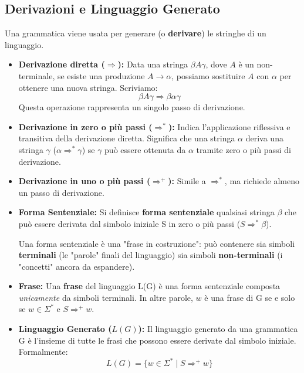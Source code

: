 \subsection{Derivazioni e Linguaggio Generato}
Una grammatica viene usata per generare (o \textbf{derivare}) le stringhe di un linguaggio.
\begin{itemize}
    \item \textbf{Derivazione diretta ($\Rightarrow$):} Data una stringa $\beta A \gamma$, dove $A$ è un non-terminale, se esiste una produzione $A \rightarrow \alpha$, possiamo sostituire $A$ con $\alpha$ per ottenere una nuova stringa. Scriviamo:
    \[ \beta A \gamma \Rightarrow \beta \alpha \gamma \]
   Questa operazione rappresenta un singolo passo di derivazione. 
    
    \item \textbf{Derivazione in zero o più passi ($\Rightarrow^*$):} Indica l'applicazione riflessiva e transitiva della derivazione diretta. Significa che una stringa $\alpha$ deriva una stringa $\gamma$ ($\alpha \Rightarrow^* \gamma$) se $\gamma$ può essere ottenuta da $\alpha$ tramite zero o più passi di derivazione. 
    
    \item \textbf{Derivazione in uno o più passi ($\Rightarrow^+$):} Simile a $\Rightarrow^*$, ma richiede almeno un passo di derivazione. 
    
    \item \textbf{Forma Sentenziale:} Si definisce \textbf{forma sentenziale} qualsiasi stringa $\beta$ che può essere derivata dal simbolo iniziale S in zero o più passi ($S \Rightarrow^* \beta$). 
    
    Una forma sentenziale è una "frase in costruzione": può contenere sia simboli \textbf{terminali} (le "parole" finali del linguaggio) sia simboli \textbf{non-terminali} (i "concetti" ancora da espandere).
    
    \item \textbf{Frase:} Una \textbf{frase} del linguaggio L(G) è una forma sentenziale composta \textit{unicamente} da simboli terminali. In altre parole, $w$ è una frase di G se e solo se $w \in \Sigma^*$ e $S \Rightarrow^+ w$.

    \item \textbf{Linguaggio Generato ($L(G)$):} Il linguaggio generato da una grammatica G è l'insieme di tutte le frasi che possono essere derivate dal simbolo iniziale. Formalmente:
    \[ L(G) = \{ w \in \Sigma^* \mid S \Rightarrow^+ w \} \]
  \end{itemize}
